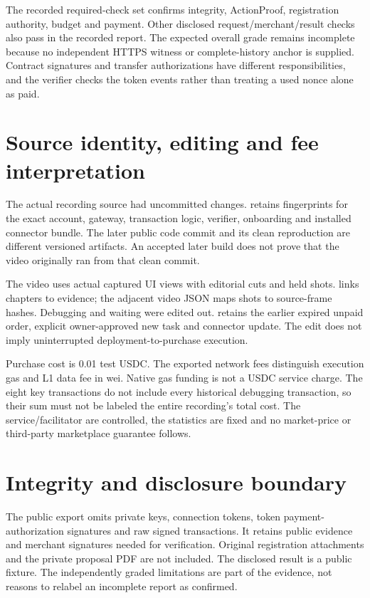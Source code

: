 The recorded required-check set confirms integrity, ActionProof, registration authority, budget and payment. Other disclosed request/merchant/result checks also pass in the recorded report. The expected overall grade remains incomplete because no independent HTTPS witness or complete-history anchor is supplied. Contract signatures and transfer authorizations have different responsibilities, and the verifier checks the token events rather than treating a used nonce alone as paid.\citep{erc1271,erc3009}

\section{Source identity, editing and fee interpretation}
The actual recording source had uncommitted changes.  retains fingerprints for the exact account, gateway, transaction logic, verifier, onboarding and installed connector bundle. The later public code commit and its clean reproduction are different versioned artifacts. An accepted later build does not prove that the video originally ran from that clean commit.\citep{repro}

The video uses actual captured UI views with editorial cuts and held shots.  links chapters to evidence; the adjacent video JSON maps shots to source-frame hashes. Debugging and waiting were edited out.  retains the earlier expired unpaid order, explicit owner-approved new task and connector update. The edit does not imply uninterrupted deployment-to-purchase execution.

Purchase cost is 0.01 test USDC. The exported network fees distinguish execution gas and L1 data fee in wei. Native gas funding is not a USDC service charge. The eight key transactions do not include every historical debugging transaction, so their sum must not be labeled the entire recording's total cost. The service/facilitator are controlled, the statistics are fixed and no market-price or third-party marketplace guarantee follows.

\section{Integrity and disclosure boundary}
The public export omits private keys, connection tokens, token payment-authorization signatures and raw signed transactions. It retains public evidence and merchant signatures needed for verification. Original registration attachments and the private proposal PDF are not included. The disclosed result is a public fixture. The independently graded limitations are part of the evidence, not reasons to relabel an incomplete report as confirmed.
